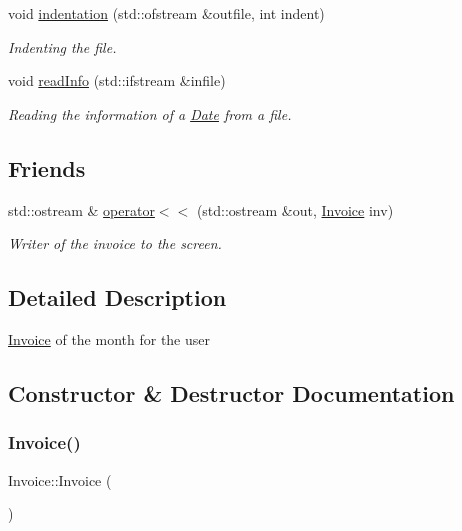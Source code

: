 \begin{DoxyCompactItemize}
$$void \mbox{\hyperlink{class_invoice_a08ce5090cf11e9f74820810d3796dea2}{indentation}} (std\+::ofstream \&outfile, int indent)
\begin{DoxyCompactList}\small\item\em Indenting the file. \end{DoxyCompactList}\item 
void \mbox{\hyperlink{class_invoice_aae19e485510f08c56be425b4634246ed}{read\+Info}} (std\+::ifstream \&infile)
\begin{DoxyCompactList}\small\item\em Reading the information of a \mbox{\hyperlink{class_date}{Date}} from a file. \end{DoxyCompactList}\end{DoxyCompactItemize}
\subsection*{Friends}
\begin{DoxyCompactItemize}
\item 
std\+::ostream \& \mbox{\hyperlink{class_invoice_a1ff3da2cc7abd9df37b2936772ce9ff7}{operator$<$$<$}} (std\+::ostream \&out, \mbox{\hyperlink{class_invoice}{Invoice}} inv)
\begin{DoxyCompactList}\small\item\em Writer of the invoice to the screen. \end{DoxyCompactList}\end{DoxyCompactItemize}


\subsection{Detailed Description}
\mbox{\hyperlink{class_invoice}{Invoice}} of the month for the user 

\subsection{Constructor \& Destructor Documentation}
\mbox{\label{class_invoice_a25d6ad261479340ac3775e21f03eef90}} 
\subsubsection{\texorpdfstring{Invoice()}{Invoice()}\hspace{0.1cm}{\footnotesize\ttfamily [1/2]}}
{\footnotesize\ttfamily Invoice\+::\+Invoice (\begin{DoxyParamCaption}{ }\end{DoxyParamCaption})\hspace{0.3cm}{\ttfamily [inline]}}



